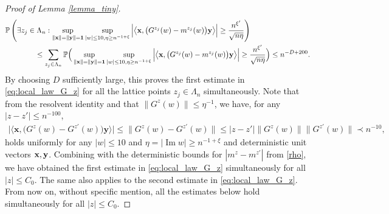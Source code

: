 \documentclass[10pt,reqno]{amsart}
\renewcommand{\Im}{\operatorname{Im}}
\newcommand{\dd}{\mathrm{d}}
\newcommand{\<}{\langle}
\renewcommand{\>}{\rangle}
\numberwithin{equation}{section}
\begin{document}
\begin{proof}[Proof of Lemma \ref{lemma_tiny}]
    \begin{align}\label{union}
    &\mathbb{P}\left( \exists z_j \in  \Lambda_n  : \sup_{\|\bf{x}\|=\|\bf{y}\|=1} \sup_{|w|\leq 10, \eta \geq n^{-1+\xi}} \Big| \big\langle \mathbf{x}, \big(G^{z_j}(w)-m^{z_j}(w)\big) \mathbf{y} \big\rangle \Big|  \geq \frac{n^{\xi'}}{\sqrt{n\eta}}  \right) \\
    & \qquad \qquad \leq \sum_{z_j \in \Lambda_n}\mathbb{P}\Big(  \sup_{\|\bf{x}\|=\|\bf{y}\|=1} \sup_{|w|\leq 10, \eta \geq n^{-1+\xi}} \Big| \big\langle \mathbf{x}, \big(G^{z_j}(w)-m^{z_j}(w)\big) \mathbf{y} \big\rangle \Big|  \geq \frac{n^{\xi'}}{\sqrt{n\eta}} \Big) \leq n^{-D+200}.
    \end{align}
    By choosing $D$ sufficiently large, this proves the first estimate in \eqref{eq:local_law_G_z} for all  the lattice points $z_j \in \Lambda_n$ simultaneously. Note that from the resolvent identity and that $\|G^z(w)\| \leq \eta^{-1}$, we have, for any $|z-z'| \leq n^{-100}$,
    \begin{align}
    \Big| \big\langle \mathbf{x}, \big(G^{z}(w)-G^{z'}(w)\big) \mathbf{y} \big\rangle \Big|  \leq \|G^{z}(w)-G^{z'}(w)\| \leq  |z-z'| \|G^{z}(w)\| \|G^{z'}(w)\| \prec n^{-10},
    \end{align}
    holds uniformly for any $|w|\leq 10$ and $\eta=|\Im w| \geq n^{-1+\xi}$ and deterministic unit vectors $\bf{x}, \bf{y}$.  Combining with the deterministic bounds for $|m^{z}-m^{z'}|$ from \eqref{rho}, we have obtained the first estimate in \eqref{eq:local_law_G_z} simultaneously for all $|z|\leq C_0$. The same also applies to the second estimate in \eqref{eq:local_law_G_z}. From now on, without specific mention, all the estimates below hold simultaneously for all $|z|\leq C_0$.  
	

\end{proof}
\end{document}
